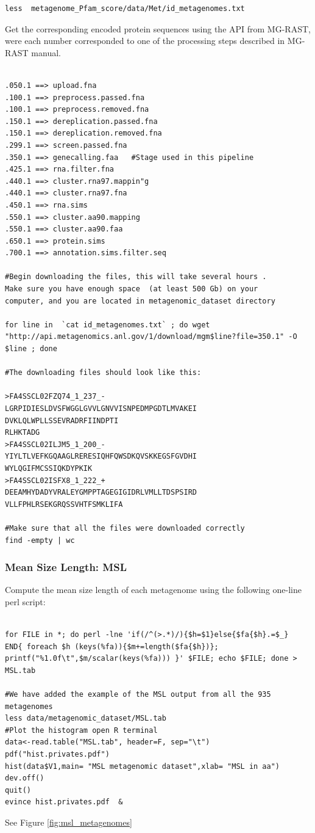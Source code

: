 \documentclass[12pt]{report}
\begin{document}
\begin{verbatim}
less  metagenome_Pfam_score/data/Met/id_metagenomes.txt
\end{verbatim}

Get the corresponding encoded protein sequences using the API from MG-RAST, were each number corresponded to one of the processing steps described in MG-RAST manual.



\begin{verbatim}

.050.1 ==> upload.fna                 
.100.1 ==> preprocess.passed.fna      
.100.1 ==> preprocess.removed.fna     
.150.1 ==> dereplication.passed.fna   
.150.1 ==> dereplication.removed.fna  
.299.1 ==> screen.passed.fna          
.350.1 ==> genecalling.faa   #Stage used in this pipeline  
.425.1 ==> rna.filter.fna             
.440.1 ==> cluster.rna97.mappin"g      
.440.1 ==> cluster.rna97.fna          
.450.1 ==> rna.sims                   
.550.1 ==> cluster.aa90.mapping       
.550.1 ==> cluster.aa90.faa           
.650.1 ==> protein.sims               
.700.1 ==> annotation.sims.filter.seq 

#Begin downloading the files, this will take several hours . 
Make sure you have enough space  (at least 500 Gb) on your 
computer, and you are located in metagenomic_dataset directory

for line in  `cat id_metagenomes.txt` ; do wget "http://api.metagenomics.anl.gov/1/download/mgm$line?file=350.1" -O $line ; done

#The downloading files should look like this:

>FA4SSCL02FZQ74_1_237_-
LGRPIDIESLDVSFWGGLGVVLGNVVISNPEDMPGDTLMVAKEI
DVKLQLWPLLSSEVRADRFIINDPTI
RLHKTADG
>FA4SSCL02ILJM5_1_200_-
YIYLTLVEFKGQAAGLRERESIQHFQWSDKQVSKKEGSFGVDHI
WYLQGIFMCSSIQKDYPKIK
>FA4SSCL02ISFX8_1_222_+
DEEAMHYDADYVRALEYGMPPTAGEGIGIDRLVMLLTDSPSIRD
VLLFPHLRSEKGRQSSVHTFSMKLIFA

#Make sure that all the files were downloaded correctly 
find -empty | wc
\end{verbatim}

\subsubsection{Mean Size Length: MSL}
\label{msl}
Compute the mean size length of each metagenome  using the following one-line perl script:

\begin{verbatim}

for FILE in *; do perl -lne 'if(/^(>.*)/){$h=$1}else{$fa{$h}.=$_} 
END{ foreach $h (keys(%fa)){$m+=length($fa{$h})}; 
printf("%1.0f\t",$m/scalar(keys(%fa))) }' $FILE; echo $FILE; done > 
MSL.tab

#We have added the example of the MSL output from all the 935 metagenomes  
less data/metagenomic_dataset/MSL.tab
#Plot the histogram open R terminal 
data<-read.table("MSL.tab", header=F, sep="\t")
pdf("hist.privates.pdf")
hist(data$V1,main= "MSL metagenomic dataset",xlab= "MSL in aa")
dev.off()
quit()
evince hist.privates.pdf  & 
\end{verbatim}
See Figure \ref{fig:msl_metagenomes}
\end{document}

